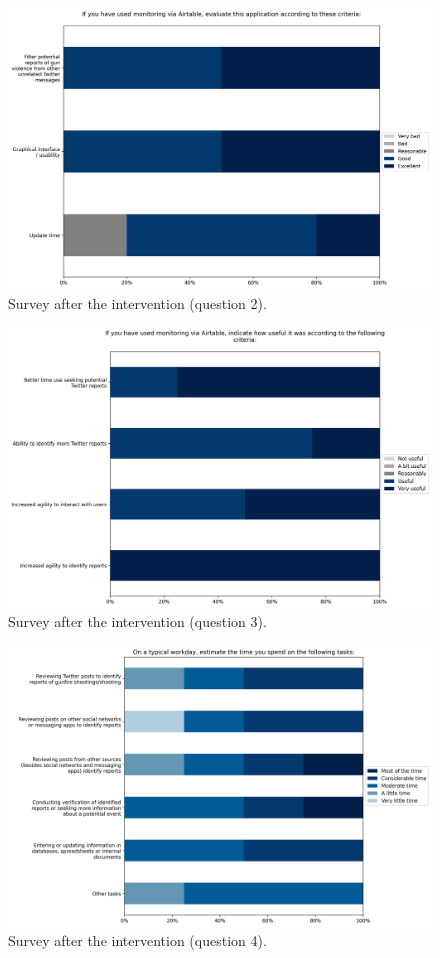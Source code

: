 \documentclass[11pt,letterpaper]{article}
\begin{document}
\begin{figure}[H]
    \centering
    \includegraphics[width=0.8\linewidth]{figs/appendix/post-survey/pos_q2.png}
    \caption{Survey after the intervention (question 2).}
    \label{fig:postsurvey2}
\end{figure}

\begin{figure}[H]
    \centering
    \includegraphics[width=0.8\linewidth]{figs/appendix/post-survey/pos_q3.png}
    \caption{Survey after the intervention (question 3).}
    \label{fig:postsurvey3}
\end{figure}

\begin{figure}[H]
    \centering
    \includegraphics[width=0.8\linewidth]{figs/appendix/post-survey/pos_q4.png}
    \caption{Survey after the intervention (question 4).}
    \label{fig:postsurvey4}
\end{figure}
\end{document}
